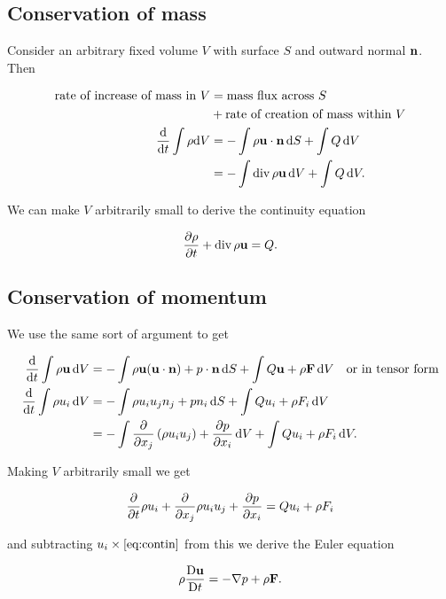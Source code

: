 \documentclass{notes}
\DeclareMathOperator{\dive}{div}
\begin{document}
\subsection{Conservation of mass}

Consider an arbitrary fixed volume $V$ with surface $S$ and outward
normal $\mathbf{n}$.  Then

\begin{align*}
\text{rate of increase of mass in $V$}
&= \text{mass flux across $S$} \\ &
+ \text{rate of creation of mass within $V$} \\
\ddt{} \int \rho \ud V & = - \int \rho \vu \cdot \vn\, \ud S
+ \int Q\, \ud V \\
& = - \int \dive \rho \vu\, \ud V + \int Q\, \ud V.
\end{align*}

We can make $V$ arbitrarily small to derive the continuity equation

\begin{equation}\label{eq:contin}
\pddt{\rho} + \dive \rho \vu = Q.
\end{equation}

\subsection{Conservation of momentum}

We use the same sort of argument to get

\begin{align*}
\frac{\mathrm{d}}{\mathrm{d} t} \int \rho \mathbf{u}\, \mathrm{d} V & = - \int \rho \mathbf{u} (\mathbf{u} \cdot \mathbf{n})
+ p \cdot \mathbf{n}\, \mathrm{d} S + \int Q \mathbf{u} + \rho \mathbf{F}\, \mathrm{d} V \quad
\text{or in tensor form} \\
\frac{\mathrm{d}}{\mathrm{d} t} \int \rho u_i\, \mathrm{d} V &= - \int \rho u_i u_j n_j + p n_i\, \mathrm{d} S
+ \int Q u_i + \rho F_i\, \mathrm{d} V \\
&= - \int \frac{\partial }{\partial x_j} \left( \rho u_i u_j \right) + \frac{\partial p}{\partial x_i}\, \mathrm{d} V
+ \int Q u_i + \rho F_i\, \mathrm{d} V.
\end{align*}

Making $V$ arbitrarily small we get

\begin{equation}\label{eq:consmom}
\frac{\partial }{\partial t} \rho u_i + \frac{\partial }{\partial x_j} \rho u_i u_j + \frac{\partial p}{\partial x_i} = Q u_i + \rho F_i
\end{equation}

and subtracting $u_i \times \eqref{eq:contin}$ from this we derive the
Euler equation

\begin{equation}\label{eq:euler}
\rho \frac{\mathrm{D}\mathbf{u}}{\mathrm{D} t} = - \nabla p + \rho \mathbf{F}.
\end{equation}
\end{document}
